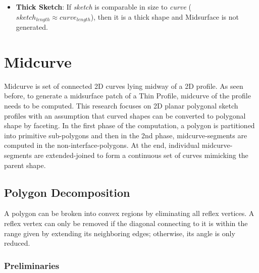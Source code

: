 \begin{itemize}[noitemsep,topsep=2pt,parsep=2pt,partopsep=2pt]
\item {\bf Thick Sketch}:   If {\em sketch} is comparable in size to {\em curve}  ($sketch_{length} \approx curve_{length}$), then it is a thick shape and Midsurface is not generated.

\end{itemize}

\section{Midcurve} \label{sec:midcurve}
Midcurve is set of connected 2D curves lying midway of a 2D profile. As seen before, to generate a midsurface patch of a Thin Profile, midcurve of the profile needs to be computed. This research focuses on 2D planar polygonal sketch profiles with an assumption that curved shapes can be converted to polygonal shape by faceting. In the first  phase of the computation, a  polygon is partitioned into primitive sub-polygons and then in the 2nd phase, midcurve-segments are computed in the non-interface-polygons.  At the end, individual midcurve-segments  are extended-joined to form a continuous set of curves mimicking the parent shape. 

\subsection{Polygon Decomposition}
A polygon can be broken into convex regions by eliminating all reflex vertices. A reflex vertex can only be removed if the diagonal connecting to it is within the range given by extending its neighboring edges; otherwise, its angle is only reduced.

\subsubsection{Preliminaries}

